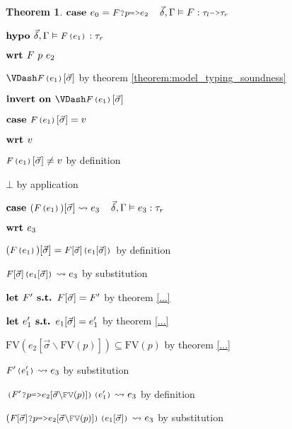 \documentclass[acmsmall]{acmart}
\theoremstyle{definition}
\newtheorem{theorem}{Theorem}[section]
\begin{document}
\begin{theorem}
    \item \Z $\B{case }
      e_0 = \J{$F$?$p$=>$e_2$}
      \I
      \vec{\delta}, \Gamma \satisfies F \hastype \J{$\tau_l$->$\tau_r$}
    $ 
    \item \Z $\B{hypo }
      \vec{\delta}, \Gamma \satisfies \J{$F$($e_1$)} \hastype \tau_r
    $
    \item \Z $\textbf{wrt }
      F\ p\ e_2 
    $
      \item \Z\Z $\VDash \J{$F$($e_1$)}[\vec{\sigma}] $
      by theorem \ref{theorem:model_typing_soundness}
      \item \Z\Z $\B{invert on } \VDash \J{$F$($e_1$)}[\vec{\sigma}]$
      \item \Z\Z $\B{case } \J{$F$($e_1$)}[\vec{\sigma}] = v$
      \item \Z\Z $\textbf{wrt } v$
        \item \Z\Z\Z $\J{$F$($e_1$)}[\vec{\sigma}] \neq v$ by definition 
        \item \Z\Z\Z $\bot$ by application
      \item \Z\Z $\B{case } 
        (\J{$F$($e_1$)})[\vec{\sigma}] \rightsquigarrow e_3
        \I
        \vec{\delta}, \Gamma \satisfies e_3 \hastype \tau_r
      $
      \item \Z\Z $\textbf{wrt } e_3$
        \item \Z\Z\Z $(\J{$F$($e_1$)})[\vec{\sigma}] = \J{$F[\vec{\sigma}]$($e_1[\vec{\sigma}]$)}$ by definition
        \item \Z\Z\Z $\J{$F[\vec{\sigma}]$($e_1[\vec{\sigma}]$)} \rightsquigarrow e_3$ by substitution 

        \item \Z\Z\Z $\textbf{let } F' \textbf{ s.t. } F[\vec{\sigma}] = F'$ by theorem \ref{...} 
        \item \Z\Z\Z $\textbf{let } e_1' \textbf{ s.t. } e_1[\vec{\sigma}] = e_1'$ by theorem \ref{...} 

        \item \Z\Z\Z $\text{FV}(e_2[\vec{\sigma}\backslash\text{FV}(p)]) \subseteq \text{FV}(p)$ 
        by theorem \ref{...} 

        \item \Z\Z\Z $\J{$F'$($e_1'$)} \rightsquigarrow e_3$ by substitution 
        \item \Z\Z\Z $\J{($F'$?$p$=>$e_2[\vec{\sigma}\backslash\text{FV}(p)]$)($e_1'$)} \rightsquigarrow e_3$ by definition 
        \item \Z\Z\Z $(\J{$F[\vec{\sigma}]$?$p$=>$e_2[\vec{\sigma}\backslash\text{FV}(p)]$)($e_1[\vec{\sigma}]$)} \rightsquigarrow e_3$ by substitution 


\end{theorem}
\end{document}
